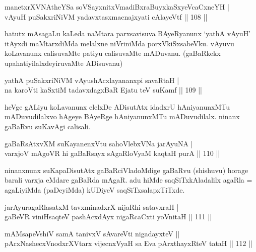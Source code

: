 
\begin{shl}
manetxrXVNAtheYSa soVSayxnitxVmadiBxraBuyxkaSxyeVcaCxneYH | \\
vAyuH puSakxriNiVM yadavxtasxmacnajxyati cAlayeVtf \hfill|| 108 || 
\end{shl}

\begin{artha}
hatutx mAsagaLu kaLeda naMtara parxsavisuva BAyeRyanunx `yathA vAyuH' 
itAyxdi maMtarxdiMda melalxne niVriniMda porxVkiSxsabeVku. vAyuvu 
koLavanunx calisuvaMte patiyu calisuvaMte mADuvanu. (gaBaRkekx 
upahatiyilalxdeyiruvaMte ADisuvanu)
\end{artha}


\begin{shl}
yathA puSakxriNiVM vAyushAcxlayananxpi savaRtaH | \\
na karoVti kaSxtiM tadavxdagxBaR Ejatu teV suKamf \hfill|| 109 || 
\end{shl}

\begin{artha}
heVge gALiyu koLavanunx elelxDe ADisutAtx idadxrU hAniyanunxMTu 
mADuvudilalxvo hAgeye BAyeRge hAniyanunxMTu mADuvudilalx. ninanx 
gaBaRvu suKavAgi calisali.
\end{artha}

\begin{shl}
gaBaRsAtxvXM suKayanenxVtu sahoVlebxVNa jarAyuNA | \\
varxjoV mAgoVR hi gaBaRsayx sAgaRloV\s yaM kaqtaH purA \hfill|| 110 || 
\end{shl}

\begin{artha}
ninanxnunx suKapaDisutAtx gaBaRciVladoMdige gaBaRvu (shishuvu) horage 
barali varxja eMdare gaBaRda mAgaR. adu hiMde saqSiTxkAladalilx agaRla 
= agaLiyiMda (paDeyiMda) kUDiyeV saqSiTxsalapxTiTxde.
\end{artha}


\begin{shl}
jarAyuragaRlasatxM tavxminadxrX nijaRhi satavxraH | \\
gaBeVR viniHsaqteV pashAcxdAyx nigaRcaCxti yoVnitaH \hfill|| 111 || 
\end{shl}

\begin{shl}
mAMsapeVshiV samA tanivxV sA\s vareVti nigadayxteV || \\
pArxNashecxVnodxrXV\s tarx vijecnxVyaH sa Eva pArxthayxRteV tataH \hfill|| 112 || 
\end{shl}

